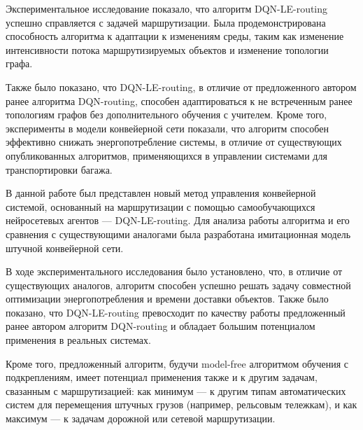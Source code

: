 \documentclass[specification,annotation,times]{itmo-student-thesis}
\theoremstyle{definition}
\begin{document}

\chapterconclusion

Экспериментальное исследование показало, что алгоритм DQN-LE-routing успешно
справляется с задачей маршрутизации. Была продемонстрирована способность
алгоритма к адаптации к изменениям среды, таким как изменение интенсивности
потока маршрутизируемых объектов и изменение топологии графа.

Также было показано, что DQN-LE-routing, в отличие от предложенного автором
ранее алгоритма DQN-routing, способен адаптироваться к не встреченным ранее
топологиям графов без дополнительного обучения с учителем. Кроме того,
эксперименты в модели конвейерной сети показали, что алгоритм способен
эффективно снижать энергопотребление системы, в отличие от существующих
опубликованных алгоритмов, применяющихся в управлении системами для
транспортировки багажа.

\startconclusionpage

В данной работе был представлен новый метод управления конвейерной системой,
основанный на маршрутизации с помощью самообучающихся нейросетевых агентов ---
DQN-LE-routing. Для анализа работы алгоритма и его сравнения с существующими
аналогами была разработана имитационная модель штучной конвейерной сети.

В ходе экспериментального исследования было установлено, что, в отличие от
существующих аналогов, алгоритм способен успешно решать задачу совместной
оптимизации энергопотребления и времени доставки объектов. Также было показано,
что DQN-LE-routing превосходит по качеству работы предложенный ранее автором
алгоритм DQN-routing и обладает большим потенциалом применения в реальных системах.

Кроме того, предложенный алгоритм, будучи model-free алгоритмом обучения с
подкреплениям, имеет потенциал применения также и к другим задачам, свазанным с
маршрутизацией: как минимум --- к другим типам автоматических систем для
перемещения штучных грузов (например, рельсовым тележкам), и как максимум --- к
задачам дорожной или сетевой маршрутизации.
\end{document}

